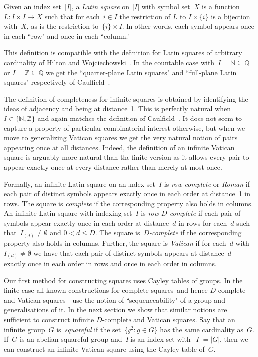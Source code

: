 \documentclass[12pt,a4paper]{article}
\newcommand{\Z}{\mathbb{Z}}
\newcommand{\N}{\mathbb{N}}
\newcommand{\Q}{\mathbb{Q}}
\begin{document}
Given an index set~$|I|$, a {\em Latin square} on~$|I|$ with symbol set~$X$ is a function $L: I \times I \rightarrow X$ such that for each~$i \in I$ the restriction of $L$ to $I \times \{i\}$ is a bijection with~$X$, as is the restriction to~$\{i\} \times I$.   In other words, each symbol appears once in each ``row" and once in each ``column."  

This definition is  compatible with the definition for Latin squares of arbitrary cardinality of Hilton and Wojciechowski~\cite{HW05}.  In the countable case with~$I = \N \subseteq \Q$ or $I = \Z \subseteq \Q$ we get the ``quarter-plane Latin squares" and ``full-plane Latin squares" respectively of Caulfield~\cite{Caulfield96}.




The definition of completeness for infinite squares is obtained by identifying the ideas of adjacency and being at distance~1.  This is perfectly natural when~$I \in \{ \N ,\Z\}$ and again matches the definition of Caulfield~\cite{Caulfield96}.   It does not seem to capture a property of particular combinatorial interest otherwise, but when we move to generalizing Vatican squares we get the very natural notion of pairs appearing once at all distances.  Indeed, the definition of an infinite Vatican square is arguably more natural than the finite version as it allows every pair to appear exactly once at every distance rather than merely at most once.

Formally, an infinite Latin square on an index set~$I$  is {\em row complete} or {\em Roman} if each pair of distinct symbols appears exactly once in each order at distance~1 in rows.  The square is {\em complete} if the corresponding property also holds in columns.   An infinite Latin square with indexing set~$I$ is {\em row $D$-complete} if each pair of symbols appear exactly once in each order at distance~$d$ in rows for each~$d$ such that~$I_{(d)} \neq \emptyset$ and $0 < d \leq D$. The square is~{\em $D$-complete} if the corresponding property also holds in columns. Further, the square is {\em Vatican} if for each~$d$ with~$I_{(d)} \neq \emptyset$ we have that each pair of distinct symbols appears at distance~$d$ exactly once in each order in rows and once in each order in columns.



Our first method for constructing squares uses Cayley tables of groups.   In the finite case all known constructions for complete squares--and hence $D$-complete and Vatican squares---use the notion of ``sequenceability" of a group and generalisations of it.  In the next section we show that similar notions are sufficient to construct infinite $D$-complete and Vatican  squares.  Say that an infinite group~$G$ is~{\em squareful} if the set~$\{ g^2 : g \in G\}$ has the same cardinality as~$G$.  If~$G$ is an abelian squareful group and~$I$ is an index set with~$|I| = |G|$, then we can construct an infinite Vatican square using the Cayley table of~$G$. 
\end{document}
